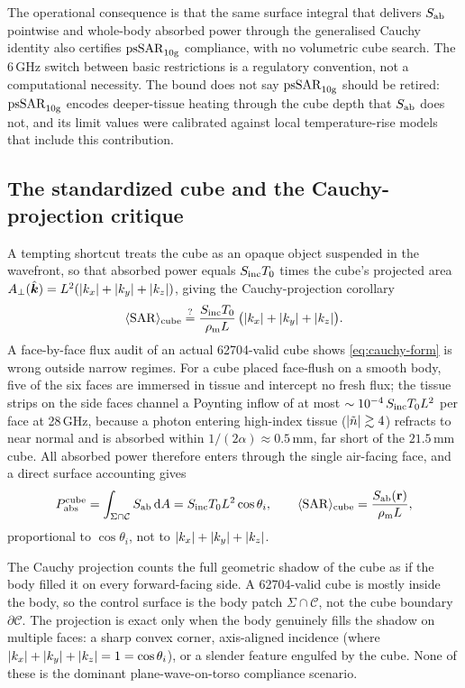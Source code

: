 The operational consequence is that the same surface integral that delivers
$S_{\mathrm{ab}}$ pointwise and whole-body absorbed power through the generalised Cauchy
identity also certifies $\mathrm{psSAR}_{10\mathrm{g}}$ compliance, with no volumetric cube search. The
6\,GHz switch between basic restrictions is a regulatory convention, not a
computational necessity. The bound does not say $\mathrm{psSAR}_{10\mathrm{g}}$ should be retired:
$\mathrm{psSAR}_{10\mathrm{g}}$ encodes deeper-tissue heating through the cube depth that $S_{\mathrm{ab}}$ does
not, and its limit values were calibrated against local temperature-rise models
that include this contribution.

\subsection{The standardized cube and the Cauchy-projection critique}
\label{sec:pssar-cube}

A tempting shortcut treats the cube as an opaque object suspended in the
wavefront, so that absorbed power equals $S_{\mathrm{inc}}T_{0}$ times the cube's
projected area $A_\perp(\hat{\bm{k}}) = L^2(\abs{k_x}+\abs{k_y}+\abs{k_z})$, giving the
Cauchy-projection corollary
\begin{equation}\label{eq:cauchy-form}
  \langle\mathrm{SAR}\rangle_{\mathrm{cube}}
  \overset{?}{=} \frac{S_{\mathrm{inc}}T_{0}}{\rho_{\mathrm{m}} L}\,
    \bigl(\abs{k_x}+\abs{k_y}+\abs{k_z}\bigr).
\end{equation}
A face-by-face flux audit of an actual 62704-valid cube shows
\cref{eq:cauchy-form} is wrong outside narrow regimes. For a cube placed
face-flush on a smooth body, five of the six faces are immersed in tissue and
intercept no fresh flux; the tissue strips on the side faces channel a Poynting
inflow of at most $\sim 10^{-4}\,S_{\mathrm{inc}}T_{0} L^2$ per face at 28\,GHz, because a
photon entering high-index tissue ($\abs{\tilde{n}}\gtrsim 4$) refracts to near
normal and is absorbed within $1/(2\alpha)\approx 0.5$\,mm, far short of the
$21.5$\,mm cube. All absorbed power therefore enters through the single
air-facing face, and a direct surface accounting gives
\begin{equation}\label{eq:cube-correct}
  P_{\mathrm{abs}}^{\mathrm{cube}}
  = \int_{\Sigma\cap\mathcal{C}}S_{\mathrm{ab}}\,\mathrm{d} A
  = S_{\mathrm{inc}}T_{0} L^2\cos\theta_i,
  \qquad
  \langle\mathrm{SAR}\rangle_{\mathrm{cube}} = \frac{S_{\mathrm{ab}}(\mathbf{r})}{\rho_{\mathrm{m}} L},
\end{equation}
proportional to $\cos\theta_i$, not to $\abs{k_x}+\abs{k_y}+\abs{k_z}$.

\begin{remark}\label{rem:cauchy-break}
The Cauchy projection counts the full geometric shadow of the cube as if the
body filled it on every forward-facing side. A 62704-valid cube is mostly inside
the body, so the control surface is the body patch $\Sigma\cap\mathcal{C}$, not
the cube boundary $\partial\mathcal{C}$. The projection is exact only when the
body genuinely fills the shadow on multiple faces: a sharp convex corner,
axis-aligned incidence (where $\abs{k_x}+\abs{k_y}+\abs{k_z}=1=\cos\theta_i$),
or a slender feature engulfed by the cube. None of these is the dominant
plane-wave-on-torso compliance scenario.
\end{remark}

